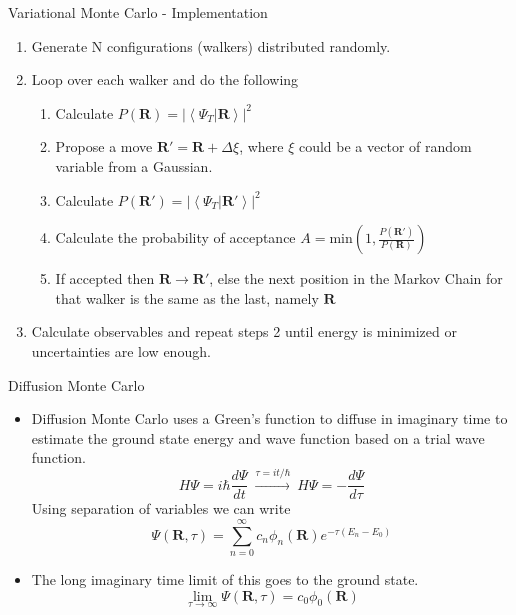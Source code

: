 \documentclass{beamer}
\newcommand{\braket}[2]{\left< #1 | #2 \right>}
\newcommand{\R}{\mathbf{R}}
\begin{document}
\begin{frame}{Variational Monte Carlo - Implementation}
\begin{enumerate}
   \item Generate N configurations (walkers) distributed randomly.
   \item Loop over each walker and do the following
   \begin{enumerate}
      \setlength\itemsep{0.2em}
      \item Calculate $P(\R) = \left|\braket{\Psi_T}{\R}\right|^2$
      \item Propose a move $\R' = \R + \Delta\xi$, where $\xi$ could be a vector of random variable from a Gaussian.
      \item Calculate $P(\R') = \left|\braket{\Psi_T}{\R'}\right|^2$
      \item Calculate the probability of acceptance $A=\mathrm{min}\left(1,\frac{P(\R')}{P(\R)}\right)$
      \item If accepted then $\R \rightarrow \R'$, else the next position in the Markov Chain for that walker is the same as the last, namely $\R$
   \end{enumerate}
   \item Calculate observables and repeat steps 2 until energy is minimized or uncertainties are low enough.
\end{enumerate}
\end{frame}

\begin{frame}{Diffusion Monte Carlo}
\begin{itemize}
   \item Diffusion Monte Carlo uses a Green's function to diffuse in imaginary time to estimate the ground state energy and wave function based on a trial wave function.
   \begin{equation*}
      H\Psi = i\hbar\frac{d\Psi}{dt} ~ \xrightarrow{\tau=it/\hbar} ~ H\Psi = -\frac{d\Psi}{d\tau}
   \end{equation*}
   Using separation of variables we can write
   \begin{equation*}
      \Psi(\R,\tau) = \sum\limits_{n=0}^{\infty} c_n\phi_n(\R) e^{-\tau(E_n-E_0)}
   \end{equation*}
   \item The long imaginary time limit of this goes to the ground state.
   \begin{equation*}
      \lim\limits_{\tau\rightarrow\infty} \Psi(\R,\tau) = c_0\phi_0(\R)
   \end{equation*}
\end{itemize}
\end{frame}
\end{document}
